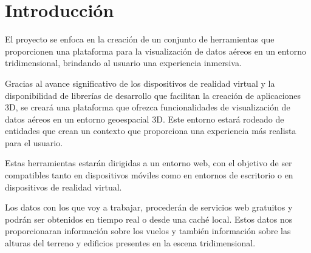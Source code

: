 \documentclass[a4paper, 11pt]{book}
\begin{document}


\tableofcontents 
\cleardoublepage
\listoffigures %



\cleardoublepage
\chapter{Introducción}
\label{sec:intro} %
El proyecto se enfoca en la creación de un conjunto de herramientas que proporcionen una plataforma para la visualización de datos aéreos en un entorno tridimensional, brindando al usuario una experiencia inmersiva.

Gracias al avance significativo de los dispositivos de realidad virtual y la disponibilidad de librerías de desarrollo que facilitan la creación de aplicaciones \gls{3D}, se creará una plataforma que ofrezca funcionalidades de visualización de datos aéreos en un entorno geoespacial \textsc{3D}. Este entorno estará rodeado de entidades que crean un contexto que proporciona una experiencia más realista para el usuario.

Estas herramientas estarán dirigidas a un entorno web, con el objetivo de ser compatibles tanto en dispositivos móviles como en entornos de escritorio o en dispositivos de realidad virtual.

Los datos con los que voy a trabajar, procederán de servicios web gratuitos y podrán ser obtenidos en tiempo real o desde una caché local. Estos datos nos proporcionaran información sobre los vuelos y también información sobre las alturas del terreno y edificios presentes en la escena tridimensional.
\end{document}
